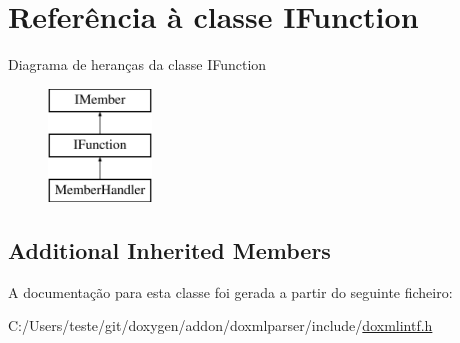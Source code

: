 \hypertarget{class_i_function}{\section{Referência à classe I\-Function}
\label{class_i_function}
}
Diagrama de heranças da classe I\-Function\begin{figure}[H]
\begin{center}
\leavevmode
\includegraphics[height=3.000000cm]{class_i_function}
\end{center}
\end{figure}
\subsection*{Additional Inherited Members}


A documentação para esta classe foi gerada a partir do seguinte ficheiro\-:\begin{DoxyCompactItemize}
\item 
C\-:/\-Users/teste/git/doxygen/addon/doxmlparser/include/\hyperlink{include_2doxmlintf_8h}{doxmlintf.\-h}\end{DoxyCompactItemize}
